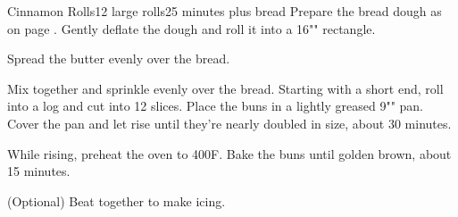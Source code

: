 \documentclass[../Cookbook.tex]{subfiles}
\begin{document}
\begin{recipe}[CinnamonRolls]{Cinnamon Rolls}{12 large rolls}{25 minutes plus bread}
	Prepare the bread dough as on page \pageref{BaseDessertBread}.
	Gently deflate the dough and roll it into a 16"" rectangle.

	Spread the butter evenly over the bread.

	Mix together and sprinkle evenly over the bread.
	Starting with a short end, roll into a log and cut into 12 slices.
	Place the buns in a lightly greased 9"" pan.
	Cover the pan and let rise until they're nearly doubled in size, about 30 minutes.

	While rising, preheat the oven to 400\0F.
	Bake the buns until golden brown, about 15 minutes.

	(Optional) Beat together to make icing.
\end{recipe}
\end{document}
